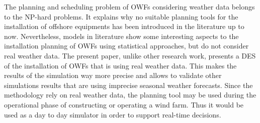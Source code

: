 The planning and scheduling problem of OWFs considering weather data belongs to the NP-hard problems. It explains why no suitable planning tools for the installation of offshore equipments has been introduced in the literature up to now. Nevertheless, models in literature show some interesting aspects to the installation planning of OWFs using statistical approaches, but do not consider real weather data. The present paper, unlike other research work, presents a DES of the installation of OWFs that is using real weather data. This makes the results of the simulation way more precise and allows to validate other simulations results that are using imprecise seasonal weather forecasts. Since the methodology rely on real weather data, the planning tool may be used during the operational phase of constructing or operating a wind farm. Thus it would be used as a day to day simulator in order to support real-time decisions.


